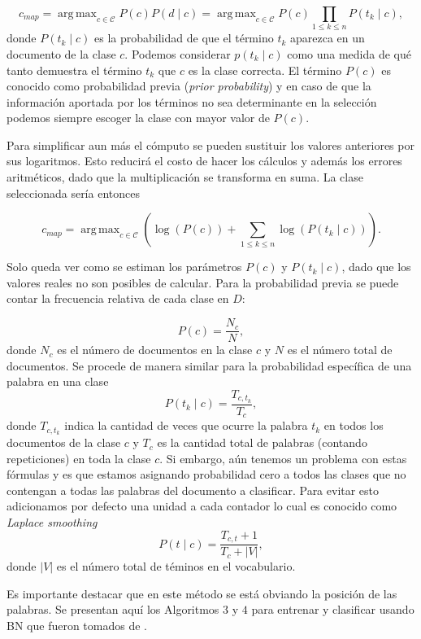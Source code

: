 \documentclass{llncs}
\DeclareMathOperator*{\argmax}{arg\,max}
\begin{document}
		\[
			c_{map} = \argmax_{c\in\mathcal{C}} P(c) P(d \mid c) = \argmax_{c\in\mathcal{C}} P(c) \prod_{1\leq k\leq n} P(t_k \mid c),
		\]
		donde $P(t_k \mid c)$ es la probabilidad de que el t\'ermino $t_k$ aparezca en un documento de la clase $c$. Podemos considerar $p(t_k \mid c)$ como una medida de qu\'e tanto demuestra el t\'ermino $t_k$ que $c$ es la clase correcta. El t\'ermino $P(c)$ es conocido como probabilidad previa (\emph{prior probability}) y en caso de que la informaci\'on aportada por los t\'erminos no sea determinante en la selecci\'on podemos siempre escoger la clase con mayor valor de $P(c)$.
		
		Para simplificar aun m\'as el c\'omputo se pueden sustituir los valores anteriores por sus logaritmos. Esto reducir\'a el costo de hacer los c\'alculos y adem\'as los errores aritm\'eticos, dado que la multiplicaci\'on se transforma en suma. La clase seleccionada ser\'ia entonces
		
		\[
				c_{map} = \argmax_{c\in\mathcal{C}} \left( \log(P(c))  + \sum_{1\leq k\leq n} \log(P(t_k\mid c)) \right).
		\]
		
		Solo queda ver como se estiman los par\'ametros $P(c)$ y $P (t_k\mid c)$, dado que los valores reales no son posibles de calcular.	Para la probabilidad previa se puede contar la frecuencia relativa de cada clase en $D$:
		
		\[P(c) = \frac{ N_c }{N} , \]
		donde $N_c$ es el n\'umero de documentos en la clase $c$ y $N$ es el n\'umero total de documentos. Se procede de manera similar para la probabilidad espec\'ifica de una palabra en una clase
		\[
			P(t_k\mid c) =\frac{ T_{c,t_k}}{T_{c}},
		\]
		donde $T_{c,t_k}$ indica la cantidad de veces que ocurre  la palabra $t_k$ en todos los documentos de la clase $c$ y $T_{c}$ es la cantidad total de palabras (contando repeticiones) en toda la clase $c$. Si embargo, a\'un tenemos un problema con estas f\'ormulas y es que estamos asignando probabilidad cero a todos las clases que no contengan a todas las palabras del documento a clasificar. Para evitar esto adicionamos por defecto una unidad a cada contador lo cual es conocido como \emph{Laplace smoothing}
		\[
			P(t\mid c) = \frac{T_{c,t} + 1}{T_c + |V|},	
		\]
		donde $|V|$ es el n\'umero total de t\'eminos en el vocabulario.
		
		 Es importante destacar que en este m\'etodo se est\'a obviando la posici\'on de las palabras. Se presentan aqu\'i los Algoritmos $3$ y $4$ para entrenar y clasificar usando BN que fueron tomados de \cite[Figure $13.2$]{B1}.
		 
\end{document}
